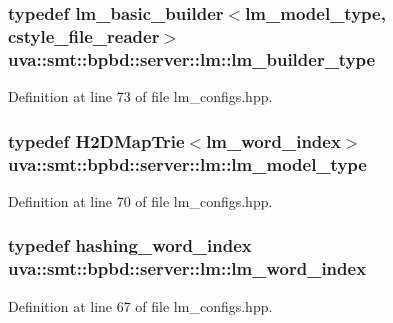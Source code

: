 \subsubsection[{lm\+\_\+builder\+\_\+type}]{\setlength{\rightskip}{0pt plus 5cm}typedef {\bf lm\+\_\+basic\+\_\+builder}$<${\bf lm\+\_\+model\+\_\+type}, {\bf cstyle\+\_\+file\+\_\+reader}$>$ {\bf uva\+::smt\+::bpbd\+::server\+::lm\+::lm\+\_\+builder\+\_\+type}}\label{namespaceuva_1_1smt_1_1bpbd_1_1server_1_1lm_aef3a083c436191e635148561bb2192c6}


Definition at line 73 of file lm\+\_\+configs.\+hpp.

\hypertarget{namespaceuva_1_1smt_1_1bpbd_1_1server_1_1lm_a1d312807a76856e10bfbed1cae210b0d}{}
\subsubsection[{lm\+\_\+model\+\_\+type}]{\setlength{\rightskip}{0pt plus 5cm}typedef {\bf H2\+D\+Map\+Trie}$<${\bf lm\+\_\+word\+\_\+index}$>$ {\bf uva\+::smt\+::bpbd\+::server\+::lm\+::lm\+\_\+model\+\_\+type}}\label{namespaceuva_1_1smt_1_1bpbd_1_1server_1_1lm_a1d312807a76856e10bfbed1cae210b0d}


Definition at line 70 of file lm\+\_\+configs.\+hpp.

\hypertarget{namespaceuva_1_1smt_1_1bpbd_1_1server_1_1lm_a023e38a6fe02511f8c3c806784c2a5f2}{}
\subsubsection[{lm\+\_\+word\+\_\+index}]{\setlength{\rightskip}{0pt plus 5cm}typedef {\bf hashing\+\_\+word\+\_\+index} {\bf uva\+::smt\+::bpbd\+::server\+::lm\+::lm\+\_\+word\+\_\+index}}\label{namespaceuva_1_1smt_1_1bpbd_1_1server_1_1lm_a023e38a6fe02511f8c3c806784c2a5f2}


Definition at line 67 of file lm\+\_\+configs.\+hpp.

\hypertarget{namespaceuva_1_1smt_1_1bpbd_1_1server_1_1lm_a96890f7df15f6df7def061b4cebb16bb}{}
